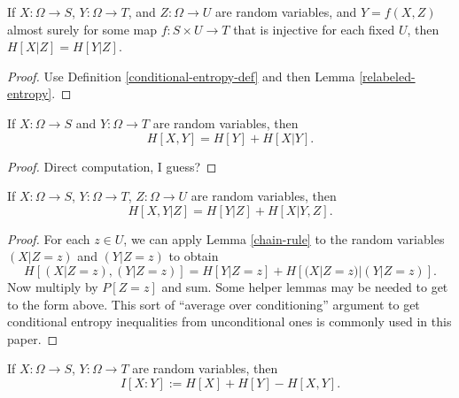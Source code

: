 \begin{lemma}\label{relabeled-entropy-cond}
  If $X: \Omega \to S$, $Y: \Omega \to T$, and $Z: \Omega \to U$ are random variables, and $Y = f(X,Z)$ almost surely for some map $f: S \times U \to T$ that is injective for each fixed $U$, then $H[X|Z] = H[Y|Z]$.
\end{lemma}

\begin{proof}   Use Definition \ref{conditional-entropy-def} and then Lemma \ref{relabeled-entropy}.
\end{proof}


\begin{lemma}\label{chain-rule}
  \leanok
  If $X: \Omega \to S$ and $Y: \Omega \to T$ are random variables, then
  $$ H[ X,Y  ] = H[Y] + H[X|Y].$$
\end{lemma}

\begin{proof}\leanok Direct computation, I guess?
\end{proof}

\begin{lemma}\label{conditional-chain-rule}
  If $X: \Omega \to S$, $Y: \Omega \to T$, $Z: \Omega \to U$ are random variables, then
$$ H[  X,Y | Z ] = H[Y | Z] + H[X|Y, Z].$$
\end{lemma}

\begin{proof}   For each $z \in U$, we can apply Lemma \ref{chain-rule} to the random variables $(X|Z=z)$ and $(Y|Z=z)$ to obtain
$$ H[ (X|Z=z),(Y|Z=z) ] = H[Y|Z=z] + H[(X|Z=z)|(Y|Z=z)].$$
Now multiply by $P[Z=z]$ and sum.  Some helper lemmas may be needed to get to the form above.  This sort of ``average over conditioning'' argument to get conditional entropy inequalities from unconditional ones is commonly used in this paper.
\end{proof}

\begin{definition}\label{information-def}
  \leanok
  If $X: \Omega \to S$, $Y: \Omega \to T$ are random variables, then
  $$ I[ X : Y ] := H[X] + H[Y] - H[X,Y].$$
\end{definition}

